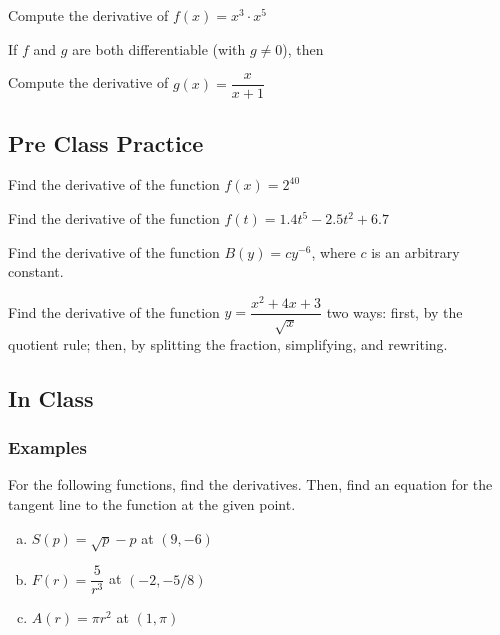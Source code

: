 \documentclass[notes]{subfiles}
\begin{document}
		\begin{ex}
			Compute the derivative of \(f(x) = x^3\cdot x^5\)
		\end{ex}

		\begin{thm}
			If \(f\) and \(g\) are both differentiable (with \(g\neq 0\)), then\\[75pt]
			
		\end{thm}

		\begin{ex}
			Compute the derivative of \(g(x) = \dfrac{x}{x+1}\)
		\end{ex}
			\newpage
			
	\subsection*{Pre Class Practice}
		\begin{ex}
			Find the derivative of the function \(f(x) = 2^{40}\)
		\end{ex}
			
		\begin{ex}
			Find the derivative of the function \(f(t) = 1.4t^5 -2.5t^2 + 6.7\)
		\end{ex}
			
		\begin{ex}
			Find the derivative of the function \(B(y) = cy^{-6}\), where \(c\) is an arbitrary constant.
		\end{ex}
			
		\begin{ex}
			Find the derivative of the function \(y = \dfrac{x^2+4x+3}{\sqrt{x}}\) two ways: first, by the quotient rule; then, by splitting the fraction, simplifying, and rewriting.
		\end{ex}
			\newpage
			
	\subsection*{In Class}
	\subsubsection*{Examples}
		\begin{ex}
			For the following functions, find the derivatives.  Then, find an equation for the tangent line to the function at the given point.
			\begin{enumerate}[(a)]
				\item \(S(p) = \sqrt{p}-p\) at \((9,-6)\)
					
			 	\item \(F(r) = \dfrac{5}{r^3}\) at \((-2,-5/8)\)
			 		
				\item \(A(r) = \pi r^2\) at \((1,\pi)\)
			\end{enumerate}
		\end{ex}
		
\end{document}
